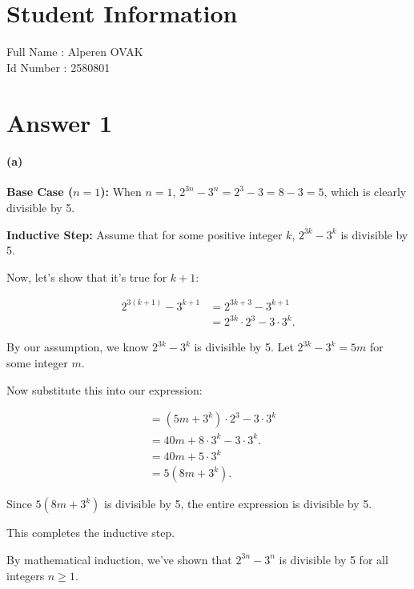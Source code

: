 \documentclass[12pt]{article}
\begin{document}
\section*{Student Information } 
Full Name :  Alperen OVAK\\
Id Number :  2580801\\

\section*{Answer 1}

\paragraph{(a)}

\textbf{Base Case (\(n = 1\)):} 
When \(n = 1\), \(2^{3n} - 3^n = 2^3 - 3 = 8 - 3 = 5\), which is clearly divisible by 5.

\textbf{Inductive Step:}
Assume that for some positive integer \(k\), \(2^{3k} - 3^k\) is divisible by 5.

Now, let's show that it's true for \(k + 1\):

\[
\begin{aligned}
2^{3(k+1)} - 3^{k+1} &= 2^{3k + 3} - 3^{k+1} \\
&= 2^{3k} \cdot 2^3 - 3 \cdot 3^k.
\end{aligned}
\]

By our assumption, we know \(2^{3k} - 3^k\) is divisible by 5. Let \(2^{3k} - 3^k = 5m\) for some integer \(m\).

Now substitute this into our expression:

\[
\begin{aligned}
&= (5m+3^k) \cdot 2^3 - 3 \cdot 3^k \\
&= 40m +8\cdot 3^k - 3 \cdot 3^k.\\
&= 40m +5\cdot 3^k\\
&= 5(8m + 3^k).
\end{aligned}
\]

Since \(5(8m + 3^k)\) is divisible by 5, the entire expression is divisible by 5.

This completes the inductive step.

By mathematical induction, we've shown that \(2^{3n} - 3^n\) is divisible by 5 for all integers \(n \geq 1\).
\end{document}
